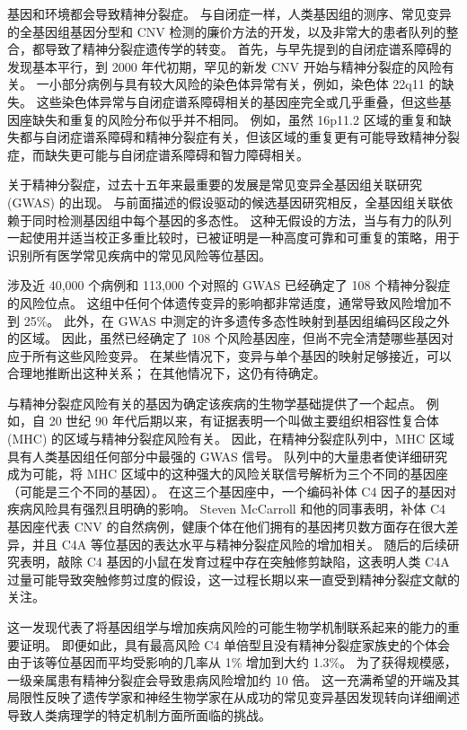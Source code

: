 基因和环境都会导致精神分裂症。 
与自闭症一样，人类基因组的测序、常见变异的全基因组基因分型和 CNV 检测的廉价方法的开发，以及非常大的患者队列的整合，都导致了精神分裂症遗传学的转变。 
首先，与早先提到的自闭症谱系障碍的发现基本平行，到 2000 年代初期，罕见的新发 CNV 开始与精神分裂症的风险有关。 
一小部分病例与具有较大风险的染色体异常有关，例如，染色体 22q11 的缺失。 
这些染色体异常与自闭症谱系障碍相关的基因座完全或几乎重叠，但这些基因座缺失和重复的风险分布似乎并不相同。 
例如，虽然 16p11.2 区域的重复和缺失都与自闭症谱系障碍和精神分裂症有关，但该区域的重复更有可能导致精神分裂症，而缺失更可能与自闭症谱系障碍和智力障碍相关。


关于精神分裂症，过去十五年来最重要的发展是常见变异全基因组关联研究 (GWAS) 的出现。 
与前面描述的假设驱动的候选基因研究相反，全基因组关联依赖于同时检测基因组中每个基因的多态性。 
这种无假设的方法，当与有力的队列一起使用并适当校正多重比较时，已被证明是一种高度可靠和可重复的策略，用于识别所有医学常见疾病中的常见风险等位基因。


涉及近 40,000 个病例和 113,000 个对照的 GWAS 已经确定了 108 个精神分裂症的风险位点。 
这组中任何个体遗传变异的影响都非常适度，通常导致风险增加不到 25\%。 
此外，在 GWAS 中测定的许多遗传多态性映射到基因组编码区段之外的区域。 因此，虽然已经确定了 108 个风险基因座，但尚不完全清楚哪些基因对应于所有这些风险变异。 
在某些情况下，变异与单个基因的映射足够接近，可以合理地推断出这种关系； 在其他情况下，这仍有待确定。


与精神分裂症风险有关的基因为确定该疾病的生物学基础提供了一个起点。 
例如，自 20 世纪 90 年代后期以来，有证据表明一个叫做主要组织相容性复合体 (MHC) 的区域与精神分裂症风险有关。 
因此，在精神分裂症队列中，MHC 区域具有人类基因组任何部分中最强的 GWAS 信号。 
队列中的大量患者使详细研究成为可能，将 MHC 区域中的这种强大的风险关联信号解析为三个不同的基因座（可能是三个不同的基因）。 
在这三个基因座中，一个编码补体 C4 因子的基因对疾病风险具有强烈且明确的影响。 
Steven McCarroll 和他的同事表明，补体 C4 基因座代表 CNV 的自然病例，健康个体在他们拥有的基因拷贝数方面存在很大差异，并且 C4A 等位基因的表达水平与精神分裂症风险的增加相关。 
随后的后续研究表明，敲除 C4 基因的小鼠在发育过程中存在突触修剪缺陷，这表明人类 C4A 过量可能导致突触修剪过度的假设，这一过程长期以来一直受到精神分裂症文献的关注。


这一发现代表了将基因组学与增加疾病风险的可能生物学机制联系起来的能力的重要证明。 
即便如此，具有最高风险 C4 单倍型且没有精神分裂症家族史的个体会由于该等位基因而平均受影响的几率从 1\% 增加到大约 1.3\%。 
为了获得规模感，一级亲属患有精神分裂症会导致患病风险增加约 10 倍。 
这一充满希望的开端及其局限性反映了遗传学家和神经生物学家在从成功的常见变异基因发现转向详细阐述导致人类病理学的特定机制方面所面临的挑战。


